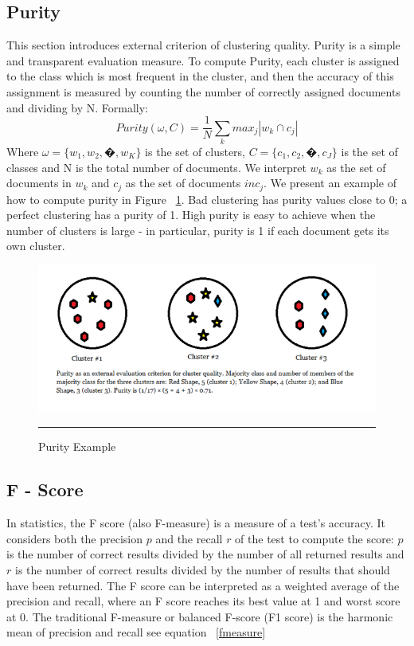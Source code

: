 \subsection{Purity}
This section introduces external criterion of clustering quality. Purity is a simple and transparent evaluation measure. To compute Purity, each cluster is assigned to the class which is most frequent in the cluster, and then the accuracy of this assignment is measured by counting the number of correctly assigned documents and dividing by N.
Formally:
\begin{equation}
Purity(\omega,C) =\frac{1}{N}\sum_k max_j|w_k \cap c_j|
\end{equation}
Where $\omega= \{w_1,w_2,�,w_K \}$  is the set of clusters,  $C= \{c_1,c_2,�,c_J \}$ is the set of classes and N is the total number of documents. We interpret $w_k$ as the set of documents in $w_k$ and $c_j$ as the set of documents $inc_j$. We present an example of how to compute purity in Figure ~\ref{fig:purityFig}. Bad clustering has purity values close to 0; a perfect clustering has a purity of 1. High purity is easy to achieve when the number of clusters is large - in particular, purity is 1 if each document gets its own cluster.
\begin{figure}[htbp]
	\centering
		\includegraphics{./Figures/Purityexample.png}
		\rule{35em}{0.5pt}
	\caption[Purity Example]{Purity Example}
	\label{fig:purityFig}
\end{figure}
\subsection{F - Score}
In statistics, the F score (also F-measure) is a measure of a test's accuracy. It considers both the precision $p$ and the recall $r$ of the test to compute the score: $p$ is the number of correct results divided by the number of all returned results and $r$ is the number of correct results divided by the number of results that should have been returned. The F score can be interpreted as a weighted average of the precision and recall, where an F score reaches its best value at 1 and worst score at 0.
The traditional F-measure or balanced F-score (F1 score) is the harmonic mean of precision and recall see equation ~\ref{fmeasure}
